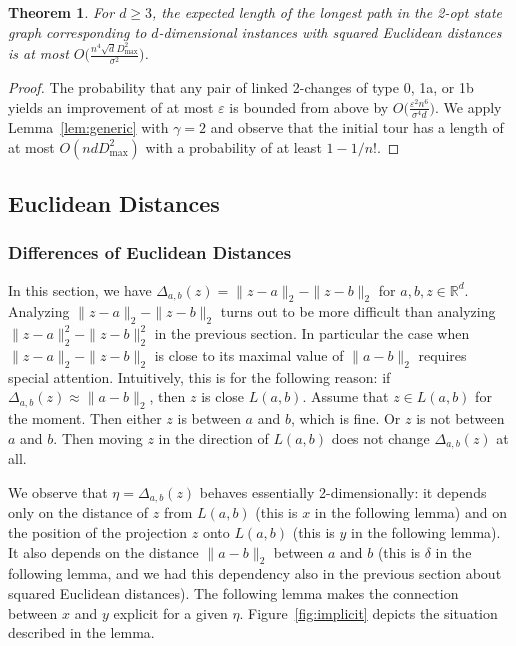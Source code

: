 \documentclass[11pt,DIV=12,a4paper]{scrartcl}
\newtheorem{theorem}[claim]{Theorem}
\newcommand{\real}{\ensuremath{\mathbb{R}}}
\newcommand{\eps}{\varepsilon}
\newcommand{\maxx}{D_{\max}}
\begin{document}
\begin{theorem}
\label{thm:sed}
For $d \geq 3$, the expected length of the longest path in the 2-opt state graph
corresponding to $d$-dimensional instances with squared Euclidean distances
is at most
$O\bigl(\frac{n^4 \sqrt d \maxx^2}{\sigma^2}\bigr)$.
\end{theorem}

\begin{proof}
The probability that any pair of linked 2-changes of type 0, 1a, or 1b yields an improvement of at most
$\eps$ is bounded from above by $O\bigl(\frac{\eps^2 n^6}{\sigma^4 d}\bigr)$.
We apply Lemma~\ref{lem:generic} with $\gamma = 2$ and observe that the initial tour has a length of at most $O(n d \maxx^2)$ with a
probability of at least $1 - 1/n!$.
\end{proof}




\subsection{Euclidean Distances}
\label{sec:euc}


\subsubsection{Differences of Euclidean Distances}


In this section, we have
$\Delta_{a,b}(z) = \|z-a\|_2 - \|z-b\|_2$
for $a, b, z \in \real^d$.
Analyzing $\|z-a\|_2 - \|z-b\|_2$ turns out to be more difficult than
analyzing $\|z-a\|^2_2 - \|z-b\|^2_2$ in the previous section. In particular the case
when $\|z-a\|_2 - \|z-b\|_2$ is close to its maximal value of $\|a-b\|_2$ requires special attention.
Intuitively, this is for the following reason: if $\Delta_{a,b}(z) \approx \|a-b\|_2$, then $z$ is close $L(a,b)$. Assume that $z \in L(a,b)$ for the moment.
Then either $z$ is between $a$ and $b$, which is fine. Or $z$ is not between $a$ and $b$. Then moving $z$ in the direction of $L(a,b)$ does not
change $\Delta_{a,b}(z)$ at all.


We observe that $\eta = \Delta_{a,b}(z)$ behaves essentially 2-dimensionally:
it depends only on the distance of $z$ from $L(a,b)$
(this is $x$ in the following lemma) and
on the position of the projection $z$ onto $L(a,b)$
(this is $y$ in the following lemma).
It also depends on the distance $\|a-b\|_2$ between $a$ and $b$
(this is $\delta$ in the following lemma, and we had this dependency also in the previous section about squared Euclidean distances).
The following lemma makes the connection between $x$ and $y$ explicit for a given $\eta$.
Figure~\ref{fig:implicit} depicts the situation described in the lemma.
\end{document}
